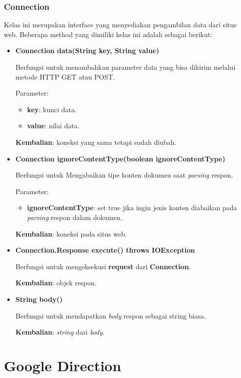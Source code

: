 \subsubsection{Connection}
\label{subsubsec:connection}

Kelas ini merupakan interface yang menyediakan pengambilan data dari situs web. Beberapa method yang dimiliki kelas ini adalah sebagai berikut:
\begin{itemize}
	\item \textbf{Connection data(String key, String value)}
	
	Berfungsi untuk menambahkan parameter data yang bisa dikirim melalui metode HTTP GET atau POST.
	
	Parameter:
	\begin{itemize}
		\item \textbf{key}: kunci data.
		\item \textbf{value}: nilai data.
	\end{itemize}
	\textbf{Kembalian}: koneksi yang sama tetapi sudah diubah.
	
	\item \textbf{Connection ignoreContentType(boolean ignoreContentType)}
	
	Berfungsi untuk Mengabaikan tipe konten dokumen saat \textit{parsing} respon.
	
	Parameter:
	\begin{itemize}
		\item \textbf{ignoreContentType}: set true jika ingin jenis konten diabaikan pada \textit{parsing} respon dalam dokumen.
	\end{itemize}
	\textbf{Kembalian}: koneksi pada situs web.
	
	\item \textbf{Connection.Response execute() throws IOException}
	
	Berfungsi untuk mengeksekusi \textbf{request} dari \textbf{Connection}.
	
	\textbf{Kembalian}: objek respon.
	
	\item \textbf{String body()}
	
	Berfungsi untuk mendapatkan \textit{body} respon sebagai string biasa.
	
	\textbf{Kembalian}: \textit{string} dari \textit{body}.
\end{itemize}

\section{Google Direction}
\label{sec:googledirapi}

